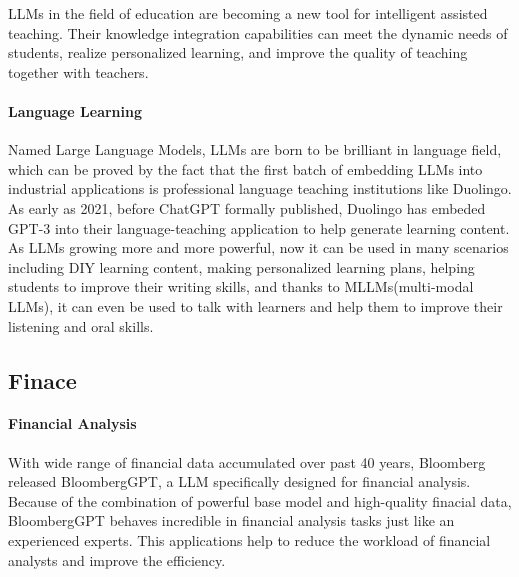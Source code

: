 \documentclass[fleqn,10pt]{SelfArx} %
\begin{document}
LLMs in the field of education are becoming a new tool for intelligent assisted teaching. Their knowledge integration capabilities can meet the dynamic needs of students, realize personalized learning, and improve the quality of teaching together with teachers.

\paragraph{Language Learning} Named Large Language Models, LLMs are born to be brilliant in language field, which can be proved by the fact that the first batch of embedding LLMs into industrial applications is professional language teaching institutions like Duolingo. As early as 2021, before ChatGPT formally published, Duolingo has embeded GPT-3 into their language-teaching application to help generate learning content. As LLMs growing more and more powerful, now it can be used in many scenarios including DIY learning content, making personalized learning plans, helping students to improve their writing skills, and thanks to MLLMs(multi-modal LLMs), it can even be used to talk with learners and help them to improve their listening and oral skills.

\subsection{Finace}


\paragraph{Financial Analysis} With wide range of financial data accumulated over past 40 years, Bloomberg released BloombergGPT, a LLM specifically designed for financial analysis. Because of the combination of powerful base model and high-quality finacial data, BloombergGPT behaves incredible in financial analysis tasks just like an experienced experts. This applications help to reduce the workload of financial analysts and improve the efficiency.






\end{document}

